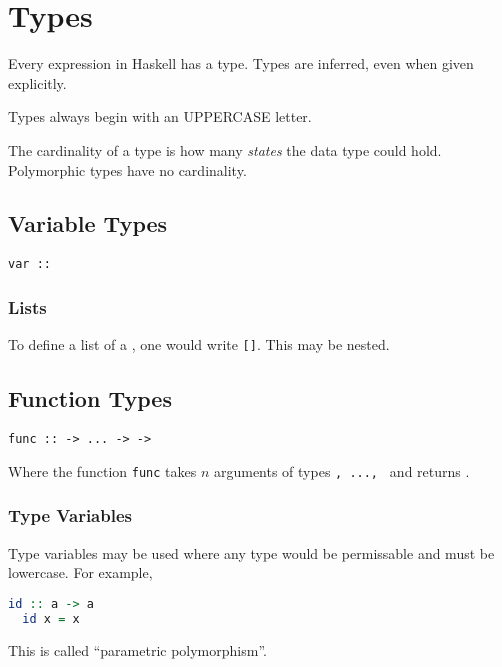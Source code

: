 \section{Types}

Every expression in Haskell has a type. Types are inferred, even when given explicitly.

Types always begin with an UPPERCASE letter.

The cardinality of a type is how many \textit{states} the data type could hold. Polymorphic types have no cardinality.

\subsection{Variable Types}

\begin{center}
  \texttt{var :: }
\end{center}

\subsubsection{Lists}

To define a list of a \texttt{}, one would write \texttt{[]}. This may be nested.

\subsection{Function Types}

\begin{center}
  \texttt{func ::  -> ... ->  -> }
\end{center}

Where the function \texttt{func} takes $n$ arguments of types \texttt{, ..., } and returns \texttt{}.

\subsubsection{Type Variables}

Type variables may be used where any type would be permissable and must be lowercase. For example,

\begin{lstlisting}[language=haskell]
  id :: a -> a
  id x = x
\end{lstlisting}

This is called ``parametric polymorphism''.

